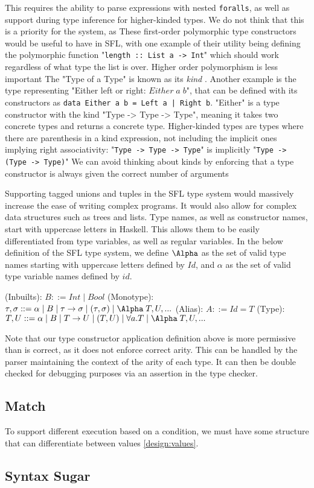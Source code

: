 This requires the ability to parse expressions with nested \verb|foralls|, as well as support during type inference for higher-kinded types. We do not think that this is a priority for the system, as 
These first-order polymorphic type constructors would be useful to have in \ac{SFL}, with one example of their utility being defining the polymorphic function "\verb|length :: List a -> Int|" which should work regardless of what type the list is over. Higher order polymorphism is less important
The "Type of a Type" is known as its \emph{kind} \cite{pierce2002types}. Another example is the type representing "Either left or right: \(Either \;a\;b\)", that can be defined with its constructors as \verb!data Either a b = Left a | Right b!. "Either" is a type constructor with the kind "Type -> Type -> Type", meaning it takes two concrete types and returns a concrete type. 
Higher-kinded types are types where there are parenthesis in a kind expression, not including the implicit ones implying right associativity: 
"\verb|Type -> Type -> Type|" is implicitly "\verb|Type -> (Type -> Type)|"
We can avoid thinking about kinds by enforcing that a type constructor is always given the correct number of arguments

Supporting tagged unions and tuples in the \ac{SFL} type system would massively increase the ease of writing complex programs. It would also allow for complex data structures such as trees and lists. 
Type names, as well as constructor names, start with uppercase letters in Haskell. This allows them to be easily differentiated from type variables, as well as regular variables. 
In the below definition of the \ac{SFL} type system, we define \(\Alpha\) as the set of valid type names starting with uppercase letters defined by \(Id\), and \(\alpha\) as the set of valid type variable names defined by \(id\). 

\begin{syntax}
(Inbuilts): \(B::=Int\mid Bool\)\newline
(Monotype): \(\tau, \sigma ::= \alpha \mid B \mid \tau \rightarrow \sigma \mid (\tau, \sigma) \mid \Alpha \;T, U,...\)\newline
(Alias): \(A ::= Id = T\)\newline
(Type): \(T, U ::= \alpha \mid B \mid T \rightarrow U \mid (T, U) \mid \forall a. T \mid \Alpha \;T, U,...\)
\end{syntax}
Note that our type constructor application definition above is more permissive than is correct, as it does not enforce correct arity. This can be handled by the parser maintaining the context of the arity of each type. It can then be double checked for debugging purposes via an assertion in the type checker. 

\subsection{Match}
To support different execution based on a condition, we must have some structure that can differentiate between values \ref{design:values}. 

\subsection{Syntax Sugar}
